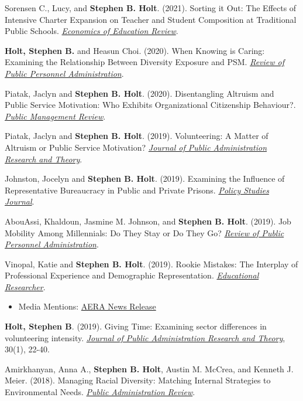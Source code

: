\documentclass[margin,line]{res}
\begin{document}
\begin{resume}
Sorensen C., Lucy, and \textbf{Stephen B. Holt}. (2021). Sorting it Out: The Effects of Intensive Charter Expansion on Teacher and Student Composition at Traditional Public Schools. \href{https://doi.org/10.1016/j.econedurev.2021.102095}{\textit{Economics of Education Review}}.

\textbf{Holt, Stephen B.} and Heasun Choi. (2020). When Knowing is Caring: Examining the Relationship Between Diversity Exposure and PSM. \href{https://doi.org/10.1177/0734371X20966652}{\textit{Review of Public Personnel Administration}}.

Piatak, Jaclyn and \textbf{Stephen B. Holt}. (2020). Disentangling Altruism and Public Service Motivation: Who Exhibits Organizational Citizenship Behaviour?. \href{https://doi.org/10.1080/14719037.2020.1740302}{\textit{Public Management Review}}.

Piatak, Jaclyn and \textbf{Stephen B. Holt}. (2019). Volunteering: A Matter of Altruism or Public Service Motivation? \href{https://doi.org/10.1093/jopart/muz041}{\textit{Journal of Public Administration Research and Theory}}.

Johnston, Jocelyn and \textbf{Stephen B. Holt}. (2019). Examining the Influence of Representative Bureaucracy in Public and Private Prisons. \href{https://doi.org/10.1111/psj.12367}{\textit{Policy Studies Journal}}.

AbouAssi, Khaldoun, Jasmine M. Johnson, and \textbf{Stephen B. Holt}. (2019). Job Mobility Among Millennials: Do They Stay or Do They Go? \href{https://doi.org/10.1177/0734371X19874396}{\textit{Review of Public Personnel Administration}}.

Vinopal, Katie and \textbf{Stephen B. Holt}. (2019). Rookie Mistakes: The Interplay of Professional Experience and Demographic Representation. \href{https://doi.org/10.3102/0013189X19867699}{\textit{Educational Researcher}}.
\begin{itemize}
\item[] Media Mentions: \href{https://www.aera.net/Newsroom/New-Research-Video-Recap-Rookie-Mistakes-The-Interplay-of-Teacher-Experience-and-Racial-Representation}{AERA News Release}
\end{itemize}

\textbf{Holt, Stephen B}. (2019). Giving Time: Examining sector differences in volunteering intensity. \href{https://doi.org/10.1093/jopart/muz007}{\textit{Journal of Public Administration Research and Theory}}, 30(1), 22-40.

Amirkhanyan, Anna A., \textbf{Stephen B. Holt}, Austin M. McCrea, and Kenneth J. Meier. (2018). Managing Racial Diversity: Matching Internal Strategies to Environmental Needs. \href{https://doi.org/10.1111/puar.12977}{\textit{Public Administration Review}}.


\end{resume}
\end{document}
